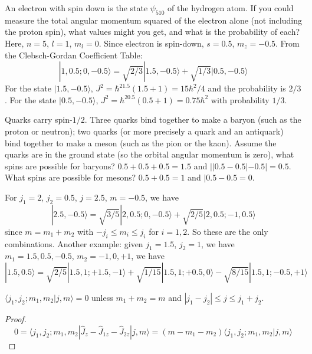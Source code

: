 \documentclass[a4paper]{article}
\begin{document}
\begin{eg}
An electron with spin down is the state $\psi_{510}$ of the hydrogen atom. If you could measure the total angular momentum squared of the electron alone (not including the proton spin), what values might you get, and what is the probability of each?\\[5pt]
Here, $n=5$, $l=1$, $m_l=0$. Since electron is spin-down, $s=0.5$, $m_z=-0.5$. From the Clebsch-Gordan Coefficient Table:
$$|1,0.5;0,-0.5\rangle=\sqrt{2/3}|1.5,-0.5\rangle+\sqrt{1/3}|0.5,-0.5\rangle$$
For the state $|1.5,-0.5\rangle$, $J^2=\hbar^21.5(1.5+1)=15\hbar^2/4$ and the probability is $2/3$. For the state $|0.5,-0.5\rangle$, $J^2=\hbar^20.5(0.5+1)=0.75\hbar^2$ with probability $1/3$.
\end{eg}
\begin{eg}
Quarks carry spin-$1/2$. Three quarks bind together to make a baryon (such as the proton or neutron); two quarks (or more precisely a quark and an antiquark) bind together to make a meson (such as the pion or the kaon). Assume the quarks are in the ground state (so the orbital angular momentum is zero), what spins are possible for baryons? $0.5+0.5+0.5=1.5$ and $||0.5-0.5|-0.5|=0.5$. What spins are possible for mesons? $0.5+0.5=1$ and $|0.5-0.5=0$.
\end{eg}
\begin{eg}
For $j_1=2$, $j_2=0.5$, $j=2.5$, $m=-0.5$, we have
$$|2.5,-0.5\rangle=\sqrt{3/5}|2,0.5;0,-0.5\rangle+\sqrt{2/5}|2,0.5;-1,0.5\rangle$$
since $m=m_1+m_2$ with $-j_i\leq m_i\leq j_i$ for $i=1,2$. So these are the only combinations. Another example: given $j_1=1.5$, $j_2=1$, we have $m_1=1.5,0.5,-0.5$, $m_2=-1,0,+1$, we have
$$|1.5,0.5\rangle=\sqrt{2/5}|1.5,1;+1.5,-1\rangle+\sqrt{1/15}|1.5,1;+0.5,0\rangle-\sqrt{8/15}|1.5,1;-0.5,+1\rangle$$
\end{eg}
\begin{thm}
$\langle j_1,j_2;m_1,m_2|j,m\rangle=0$ unless $m_1+m_2=m$ and $|j_1-j_2|\leq j\leq j_1+j_2$.
\end{thm}
\begin{proof}
$$0=\langle j_1,j_2;m_1,m_2|\hat{J}_z-\hat{J}_{1z}-\hat{J}_{2z}|j,m\rangle=(m-m_1-m_2)\langle j_1,j_2;m_1,m_2|j,m\rangle$$
\end{proof}
\newpage
\end{document}

